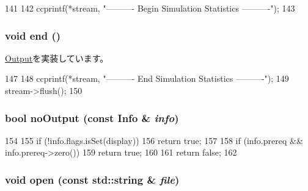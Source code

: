 \begin{DoxyCode}
141 {
142     ccprintf(*stream, "\n---------- Begin Simulation Statistics ----------\n");
143 }
\end{DoxyCode}
\hypertarget{classStats_1_1Text_aaf81d3fdaf258088d7692fa70cece087}{
\subsubsection[{end}]{\setlength{\rightskip}{0pt plus 5cm}void end ()}}
\label{classStats_1_1Text_aaf81d3fdaf258088d7692fa70cece087}


\hyperlink{structStats_1_1Output_aa540e86022c1f72380d1014d98f38f43}{Output}を実装しています。


\begin{DoxyCode}
147 {
148     ccprintf(*stream, "\n---------- End Simulation Statistics   ----------\n");
149     stream->flush();
150 }
\end{DoxyCode}
\hypertarget{classStats_1_1Text_a8641de3b6016a719808e25b94a9448e0}{
\subsubsection[{noOutput}]{\setlength{\rightskip}{0pt plus 5cm}bool noOutput (const {\bf Info} \& {\em info})}}
\label{classStats_1_1Text_a8641de3b6016a719808e25b94a9448e0}



\begin{DoxyCode}
154 {
155     if (!info.flags.isSet(display))
156         return true;
157 
158     if (info.prereq && info.prereq->zero())
159         return true;
160 
161     return false;
162 }
\end{DoxyCode}
\hypertarget{classStats_1_1Text_a5bceca6a8311701ed3d1fa7794df8fd0}{
\subsubsection[{open}]{\setlength{\rightskip}{0pt plus 5cm}void open (const std::string \& {\em file})}}
\label{classStats_1_1Text_a5bceca6a8311701ed3d1fa7794df8fd0}



